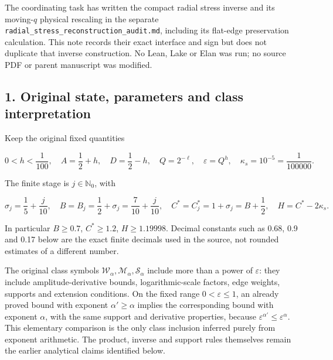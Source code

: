 \documentclass[10pt,a4paper]{article}
\begin{document}
The coordinating task has written the compact radial stress inverse and its moving-\(q\) physical rescaling in the separate \texttt{r\allowbreak{}a\allowbreak{}d\allowbreak{}i\allowbreak{}a\allowbreak{}l\allowbreak{}\_\allowbreak{}s\allowbreak{}t\allowbreak{}r\allowbreak{}e\allowbreak{}s\allowbreak{}s\allowbreak{}\_\allowbreak{}r\allowbreak{}e\allowbreak{}c\allowbreak{}o\allowbreak{}n\allowbreak{}s\allowbreak{}t\allowbreak{}r\allowbreak{}u\allowbreak{}c\allowbreak{}t\allowbreak{}i\allowbreak{}o\allowbreak{}n\allowbreak{}\_\allowbreak{}a\allowbreak{}u\allowbreak{}d\allowbreak{}i\allowbreak{}t\allowbreak{}.\allowbreak{}m\allowbreak{}d}, including its flat-edge preservation calculation. This note records their exact interface and sign but does not duplicate that inverse construction. No Lean, Lake or Elan was run; no source PDF or parent manuscript was modified.

\subsection{1. Original state, parameters and class interpretation}\label{nsupstream:stage_cycle_gain_audit:original-state-parameters-and-class-interpretation}

Keep the original fixed quantities

\[
0<h<\frac1{100},\quad A=\frac12+h,\quad D=\frac12-h,
\quad Q=2^{-\ell},\quad\varepsilon=Q^h,\quad
\kappa_s=10^{-5}=\frac1{100000}.
\tag{C1}
\]

The finite stage is \(j\in\mathbb N_0\), with

\[
\sigma_j=\frac15+\frac j{10},\quad
B=B_j=\frac12+\sigma_j=\frac7{10}+\frac j{10},\quad
C^*=C_j^*=1+\sigma_j=B+\frac12,
\quad H=C^*-2\kappa_s.
\tag{C2}
\]

In particular \(B\ge0.7\), \(C^*\ge1.2\), \(H\ge1.19998\). Decimal constants such as 0.68, 0.9 and 0.17 below are the exact finite decimals used in the source, not rounded estimates of a different number.

The original class symbols \(\mathcal W_\alpha,\mathcal M_\alpha,\mathcal S_\alpha\) include more than a power of \(\varepsilon\): they include amplitude-derivative bounds, logarithmic-scale factors, edge weights, supports and extension conditions. On the fixed range \(0<\varepsilon\le1\), an already proved bound with exponent \(\alpha'\ge\alpha\) implies the corresponding bound with exponent \(\alpha\), with the same support and derivative properties, because \(\varepsilon^{\alpha'}\le\varepsilon^\alpha\). This elementary comparison is the only class inclusion inferred purely from exponent arithmetic. The product, inverse and support rules themselves remain the earlier analytical claims identified below.
\end{document}
